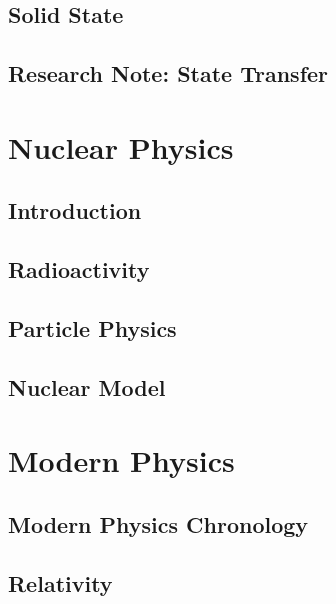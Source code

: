 \documentclass[10pt]{report}
\begin{document}
\section{Solid State}


\clearpage

\section{Research Note: State Transfer}
\label{sec:RN_PST}
\clearpage

\chapter{Nuclear Physics}\clearpage
\section{Introduction}
\clearpage

\section{Radioactivity}
\clearpage

\section{Particle Physics}
\clearpage

\section{Nuclear Model}
\clearpage

\chapter{Modern Physics}\clearpage

\section{Modern Physics Chronology}

\clearpage 

\section{Relativity}

\clearpage

\clearpage
\end{document}
